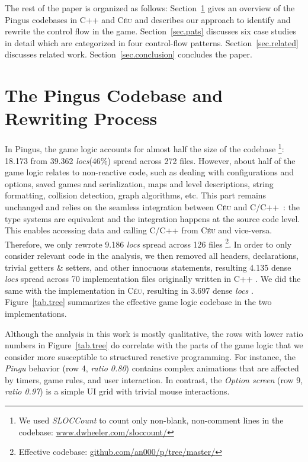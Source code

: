 \documentclass{vgtc}                          %
\newcommand{\CEU}{\textsc{C\'{e}u}\xspace}
\newcommand{\locs}{\emph{locs}\xspace}
\begin{document}
The rest of the paper is organized as follows:
Section~\ref{sec.codebase} gives an overview of the Pingus codebases in C++ and
\CEU and describes our approach to identify and rewrite the control flow in the
game.
Section~\ref{sec.pats} discusses six case studies in detail which are
categorized in four control-flow patterns.
Section~\ref{sec.related} discusses related work.
Section~\ref{sec.conclusion} concludes the paper.

\section{The Pingus Codebase and Rewriting Process}
\label{sec.codebase}


In Pingus, the game logic accounts for almost half the size of the codebase%
\footnote{
We used \emph{SLOCCount} to count only non-blank, non-comment lines in the
codebase: \url{www.dwheeler.com/sloccount/}
}:
18.173 from 39.362 \locs (46\%) spread across 272 files.
%
However, about half of the game logic relates to non-reactive code, such as
dealing with configurations and options, saved games and serialization, maps
and level descriptions, string formatting, collision detection, graph
algorithms, etc.
This part remains unchanged and relies on the seamless integration between \CEU
and C/C++~\cite{ceu.sensys13}: the type systems are equivalent and the
integration happens at the source code level.
This enables accessing data and calling C/C++ from \CEU and vice-versa.
%
Therefore, we only rewrote 9.186 \locs spread across 126 files%
\footnote{\label{codebase} Effective codebase: \url{github.com/an000/p/tree/master/}}.
%
In order to only consider relevant code in the analysis, we then removed all
headers, declarations, trivial getters \& setters, and other innocuous
statements, resulting 4.135 dense \locs spread across 70 implementation files
originally written in C++%
\footnotemark[\ref{codebase}].
We did the same with the implementation in \CEU, resulting in 3.697 dense \locs%
\footnotemark[\ref{codebase}].
%
Figure~\ref{tab.tree} summarizes the effective game logic codebase in the two
implementations.

Although the analysis in this work is mostly qualitative, the rows with lower
ratio numbers in Figure~\ref{tab.tree} do correlate with the parts of the game
logic that we consider more susceptible to structured reactive programming.
For instance, the \emph{Pingu} behavior (row 4, \emph{ratio 0.80}) contains
complex animations that are affected by timers, game rules, and user
interaction.
In contrast, the \emph{Option screen} (row 9, \emph{ratio 0.97}) is a simple UI
grid with trivial mouse interactions.
\end{document}
